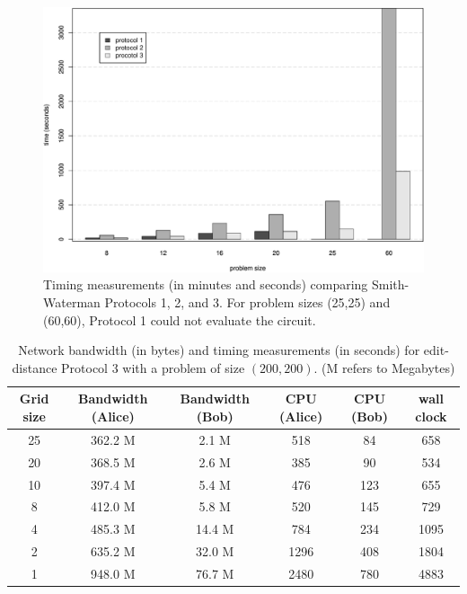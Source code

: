 \begin{figure}
\centerline{\includegraphics[scale=0.4,angle=0]{genomics/sw123}}

\caption{Timing measurements (in minutes and seconds) comparing Smith-Waterman
Protocols 1, 2, and 3. For problem sizes (25,25) and (60,60), Protocol
1 could not evaluate the circuit.}

\label{fig:sw-histogram} 
\end{figure}

\begin{table}
\begin{centering}
\begin{tabular}{|c||c|c|c|c|c|}
\hline 
Grid size &
Bandwidth (Alice) &
Bandwidth (Bob) &
CPU (Alice) &
CPU (Bob) &
wall clock \tabularnewline
\hline
\hline 
25 &
362.2 M &
2.1 M &
518 &
84 &
658 \tabularnewline
\hline 
20 &
368.5 M &
2.6 M &
385 &
90 &
534 \tabularnewline
\hline 
10 &
397.4 M &
5.4 M &
476 &
123 &
655 \tabularnewline
\hline 
8 &
412.0 M &
5.8 M &
520 &
145 &
729 \tabularnewline
\hline 
4 &
485.3 M &
14.4 M &
784 &
234 &
1095 \tabularnewline
\hline 
2 &
635.2 M&
32.0 M&
1296 &
408 &
1804 \tabularnewline
\hline 
1&
948.0 M&
76.7 M&
2480 &
780 &
4883 \tabularnewline
\hline
\end{tabular}
\par\end{centering}

\caption{Network bandwidth (in bytes) and timing measurements (in seconds)
for edit-distance Protocol 3 with a problem of size $(200,200)$.
(M refers to Megabytes)}

\label{protocol3table200} 
\end{table}




